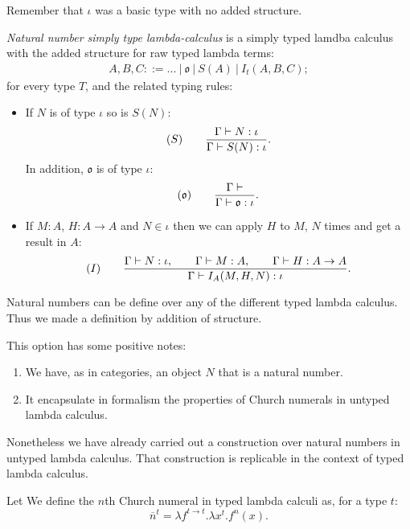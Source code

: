 \begin{definition}
\begin{remark}
  Remember that $\iota$ was a basic type with no added structure.
\end{remark}
\begin{definition}
  \emph{Natural number simply type lambda-calculus} is a simply typed lamdba calculus with the added structure for raw typed lambda terms:
  \begin{align*}
    A,B, C ::= ...\ |\ \mathfrak{o}\ |\ S(A)\ |\ I_t(A,B,C);
  \end{align*}
for every type $T$, and the related typing rules:
  \begin{itemize}
  \item If $N$ is of type $\iota$ so is $S(N)$:
    $$  (S)\qquad  {\displaystyle\Gamma \vdash N:\iota \over \Gamma \vdash S(N):\iota}.$$
    In addition, $\mathfrak{o}$ is of type $\iota$:
    $$  (\mathfrak{o})\qquad  {\displaystyle\Gamma \vdash \over \Gamma \vdash \mathfrak{o}:\iota}.$$
  \item If $M: A$, $H: A\to A$ and $N\in \iota$ then we can apply $H$ to $M$, $N$ times and get a result in $A$:
        $$  (I)\qquad  {\displaystyle\Gamma \vdash N:\iota, \qquad \Gamma \vdash M:A,\qquad \Gamma \vdash H:A\to A \over \Gamma \vdash I_A(M,H,N):\iota}.$$
  \end{itemize}
\end{definition}

\begin{remark}
  Natural numbers can be define over any of the different typed lambda calculus. Thus we made a definition by addition of structure. 
\end{remark}

This option has some positive notes:
\begin{enumerate}
\item We have, as in categories, an object $N$ that is a natural number.
\item It encapsulate in formalism the properties of Church numerals in untyped lambda calculus.
\end{enumerate}

Nonetheless we have already carried out a construction over natural numbers in untyped lambda calculus. That construction is replicable in the context of typed lambda calculus.

\begin{definition}
  Let We define the $n$th Church numeral in typed lambda calculi as, for a type $t$:
  $$\overline n^t = \lambda f^{t \to t}. \lambda x^{t}. f^{n}(x).$$
  

\end{definition}
\end{definition}
